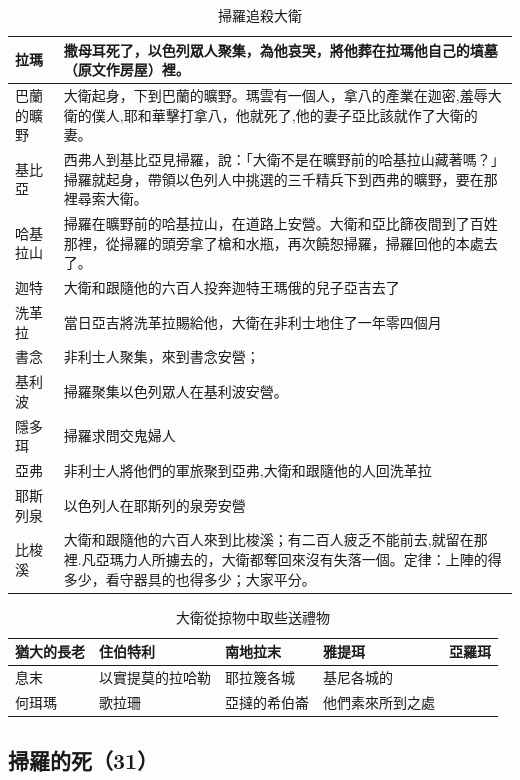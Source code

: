 \documentclass{ctexart}
\begin{document}
\begin{table}[!hbp]
\begin{tabular}{|p{1.5cm}|p{15cm}|}
拉瑪& 撒母耳死了，以色列眾人聚集，為他哀哭，將他葬在拉瑪他自己的墳墓（原文作房屋）裡。\\\hline
巴蘭的曠野&大衛起身，下到巴蘭的曠野。瑪雲有一個人，拿八的產業在迦密,羞辱大衛的僕人,耶和華擊打拿八，他就死了,他的妻子亞比該就作了大衛的妻。 \\\hline
基比亞& 西弗人到基比亞見掃羅，說：「大衛不是在曠野前的哈基拉山藏著嗎？」掃羅就起身，帶領以色列人中挑選的三千精兵下到西弗的曠野，要在那裡尋索大衛。\\\hline
哈基拉山&掃羅在曠野前的哈基拉山，在道路上安營。大衛和亞比篩夜間到了百姓那裡，從掃羅的頭旁拿了槍和水瓶，再次饒恕掃羅，掃羅回他的本處去了。 \\\hline
迦特&大衛和跟隨他的六百人投奔迦特王瑪俄的兒子亞吉去了\\\hline
洗革拉&當日亞吉將洗革拉賜給他，大衛在非利士地住了一年零四個月\\\hline
書念&非利士人聚集，來到書念安營；\\\hline
基利波&掃羅聚集以色列眾人在基利波安營。\\\hline
隱多珥&掃羅求問交鬼婦人\\\hline
亞弗&非利士人將他們的軍旅聚到亞弗,大衛和跟隨他的人回洗革拉\\\hline
耶斯列泉&以色列人在耶斯列的泉旁安營\\\hline
比梭溪&大衛和跟隨他的六百人來到比梭溪；有二百人疲乏不能前去,就留在那裡.凡亞瑪力人所擄去的，大衛都奪回來沒有失落一個。定律：上陣的得多少，看守器具的也得多少；大家平分。\\\hline
\end{tabular}
\caption{掃羅追殺大衛}
\end{table}


\begin{table}[!hbp]
\centering 
\begin{tabular}{|p{2.5cm}|p{2.5cm}|p{2.5cm}|p{2.5cm}|p{2.5cm}|}
\hline
\hline
猶大的長老 & 住伯特利 &南地拉末 &雅提珥 &亞羅珥\\\hline
息末 &以實提莫的拉哈勒 &耶拉篾各城 &基尼各城的\\\hline
何珥瑪 &歌拉珊 &亞撻的希伯崙 &他們素來所到之處\\\hline
\end{tabular}
\caption{大衛從掠物中取些送禮物}
\end{table}

\subsection{掃羅的死（31）}
\end{document}
